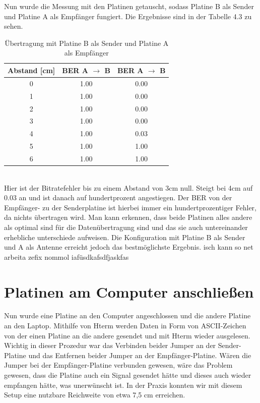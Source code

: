Nun wurde die Messung mit den Platinen getauscht, sodass Platine B als Sender und Platine A als Empfänger fungiert. Die Ergebnisse
sind in der Tabelle 4.3 zu sehen.
\begin{table}[h!]
    \centering
        \begin{tabular}{c|c|c}
            Abstand [cm] & BER A $\rightarrow$ B & BER A $\rightarrow$ B \\
            \hline
             0 & 1.00 & 0.00 \\
            \hline
             1 & 1.00 & 0.00 \\
            \hline
             2 & 1.00 & 0.00 \\
            \hline
             3 &  1.00    & 0.00 \\
            \hline
             4 &   1.00  & 0.03 \\
            \hline
             5 & 1.00 & 1.00 \\
            \hline
             6 & 1.00 & 1.00 \\
        \end{tabular}
        \caption{Übertragung mit Platine B als Sender und Platine A als Empfänger}
    \end{table}
    \\
    
Hier ist der Bitratefehler bis zu einem Abstand von 3cm null. Steigt bei 4cm auf 0.03 an und ist
danach auf hundertprozent angestiegen.
Der BER von der Empfänger- zu der Senderplatine ist hierbei immer ein hundertprozentiger Fehler, da nichts übertragen wird.
Man kann erkennen, dass beide Platinen alles andere als optimal sind für die Datenübertragung sind und
das sie auch untereinander erhebliche unterschiede aufweisen. Die Konfiguration mit Platine B als Sender und A als Antenne erreicht jedoch
das bestmöglichste Ergebnis. isch kann so net arbeita zefix nommol iafüsdkafsdfjaskfas


\section{Platinen am Computer anschließen}
Nun wurde eine Platine an den Computer angeschlossen und die andere Platine an den Laptop.
Mithilfe von Hterm werden Daten in Form von ASCII-Zeichen von der einen Platine an die andere gesendet
und mit Hterm wieder ausgelesen.
Wichtig in dieser Prozedur war das Verbinden beider Jumper an der Sender-Platine und das Entfernen beider
Jumper an der Empfänger-Platine. 
Wären die Jumper bei der Empfänger-Platine verbunden gewesen, wäre das Problem gewesen, dass die Platine auch 
ein Signal gesendet hätte und dieses auch wieder empfangen hätte, was unerwünscht ist.
In der Praxis konnten wir mit diesem Setup eine nutzbare Reichweite von etwa 7,5 cm erreichen.

